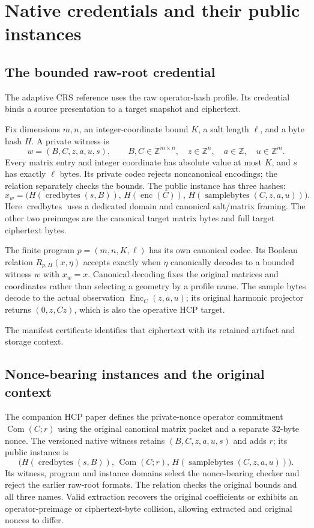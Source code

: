 \section{Native credentials and their public instances}

\subsection{The bounded raw-root credential}

The adaptive CRS reference uses the raw operator-hash profile. Its
credential binds a source presentation to a target snapshot and ciphertext.

Fix dimensions \(m,n\), an integer-coordinate bound \(K\), a salt length
\(\ell\), and a byte hash \(H\). A private witness is
\[
 w=(B,C,z,a,u,s),\qquad
 B,C\in\mathbb Z^{m\times n},\quad
 z\in\mathbb Z^n,\quad a\in\mathbb Z,\quad u\in\mathbb Z^m.
\]
Every matrix entry and integer coordinate has absolute value at most \(K\),
and \(s\) has exactly \(\ell\) bytes. Its private codec rejects noncanonical
encodings; the relation separately checks the bounds. The public instance has
three hashes:
\[
 x_w=\bigl(H(\operatorname{credbytes}(s,B)),\,
           H(\operatorname{enc}(C)),\,
           H(\operatorname{samplebytes}(C,z,a,u))\bigr).
\]
Here \(\operatorname{credbytes}\) uses a dedicated domain and canonical
salt/matrix framing. The other two preimages are the canonical target matrix
bytes and full target ciphertext bytes.

The finite program \(p=(m,n,K,\ell)\) has its own canonical codec. Its Boolean
relation \(R_{p,H}(x,\eta)\) accepts exactly when \(\eta\) canonically decodes
to a bounded witness \(w\) with \(x_w=x\). Canonical decoding fixes the
original matrices and coordinates rather than selecting a geometry by a
profile name. The sample bytes decode to the actual observation
\(\operatorname{Enc}_C(z,a,u)\); its original harmonic projector returns
\((0,z,Cz)\), which is also the operative HCP target.

The manifest certificate identifies that ciphertext with its retained
artifact and storage context.

\subsection{Nonce-bearing instances and the original context}

The companion HCP paper defines the private-nonce operator commitment
\(\operatorname{Com}(C;r)\) using the original canonical matrix packet and a
separate 32-byte nonce. The versioned native witness retains
\((B,C,z,a,u,s)\) and adds \(r\); its public instance is
\[
 \bigl(H(\operatorname{credbytes}(s,B)),\,
       \operatorname{Com}(C;r),\,
       H(\operatorname{samplebytes}(C,z,a,u))\bigr).
\]
Its witness, program and instance domains select the nonce-bearing checker
and reject the earlier raw-root formats. The relation checks the original
bounds and all three names. Valid extraction recovers the original
coefficients or exhibits an operator-preimage or ciphertext-byte collision,
allowing extracted and original nonces to differ.

